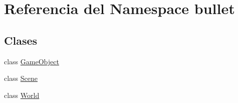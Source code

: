 \hypertarget{namespacebullet}{}\section{Referencia del Namespace bullet}
\label{namespacebullet}
\subsection*{Clases}
\begin{DoxyCompactItemize}
\item 
class \mbox{\hyperlink{classbullet_1_1_game_object}{Game\+Object}}
\item 
class \mbox{\hyperlink{classbullet_1_1_scene}{Scene}}
\item 
class \mbox{\hyperlink{classbullet_1_1_world}{World}}
\end{DoxyCompactItemize}
